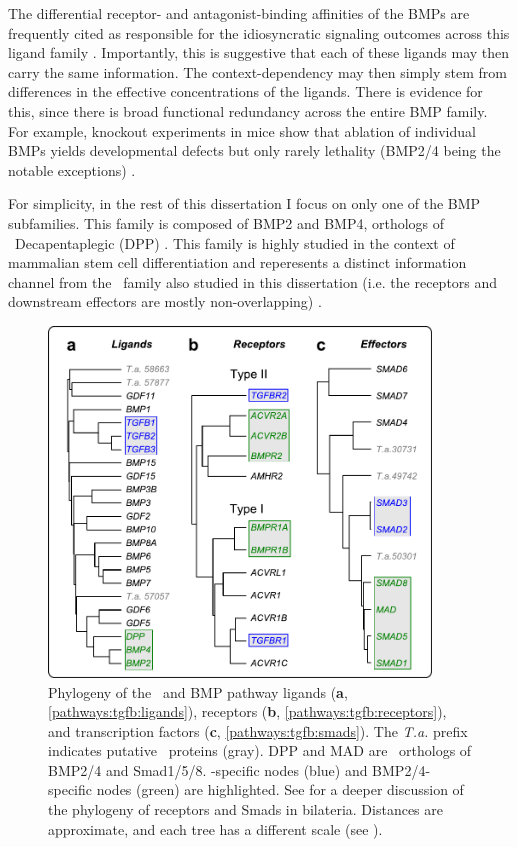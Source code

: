 The differential receptor- and antagonist-binding affinities of
the BMPs are frequently cited as responsible for the idiosyncratic signaling outcomes
across this ligand family \cite{VonBubnoff2001,Zakin2010}. Importantly,
this is suggestive that each of these ligands may then carry the same
information. The context-dependency
may then simply stem from differences in the effective concentrations of the ligands.
There is evidence for this, since there is 
broad functional redundancy across the entire BMP family.
For example, knockout experiments in mice show that ablation of individual BMPs yields
developmental defects but only rarely lethality (BMP2/4 being the notable
exceptions) \cite{Sieber2009,Bandyopadhyay2013}. 


For simplicity, in the rest of this dissertation I focus on only one of the
BMP subfamilies. This family is composed of
BMP2 and BMP4, orthologs of \fly\ Decapentaplegic (DPP) \cite{Miyazono2005}.
This family is
highly studied in the context of mammalian stem cell differentiation and reperesents
a distinct information channel from the \tgf\ family also studied in this dissertation
(i.e. the receptors and downstream effectors are mostly non-overlapping) .


  \begin{figure}[!bt]
  \centering
  \includegraphics[width=4in]{FIGS/pathways/tgfb_tree.pdf}
  {\singlespacing 
  \caption[\tgfbsf\ phylogenetic trees]
            { Phylogeny of the \tgf\ and BMP pathway
              ligands  (\textbf{a}, \autoref{pathways:tgfb:ligands}),
              receptors (\textbf{b}, \autoref{pathways:tgfb:receptors}), and
              transcription factors (\textbf{c}, \autoref{pathways:tgfb:smads}).
              The \textit{T.a.} prefix indicates putative \ta\ proteins (gray).
			  DPP and MAD are \fly\ orthologs of BMP2/4 and Smad1/5/8.
              \tgf-specific nodes (blue) and BMP2/4-specific nodes (green) are highlighted.
              See \cite{Huminiecki2009} for a deeper discussion of the phylogeny of
              receptors and Smads in bilateria. Distances are approximate,
			  and each tree has a different scale (see ).}
  \label{fig:tgfb:trees}}
  \end{figure}

